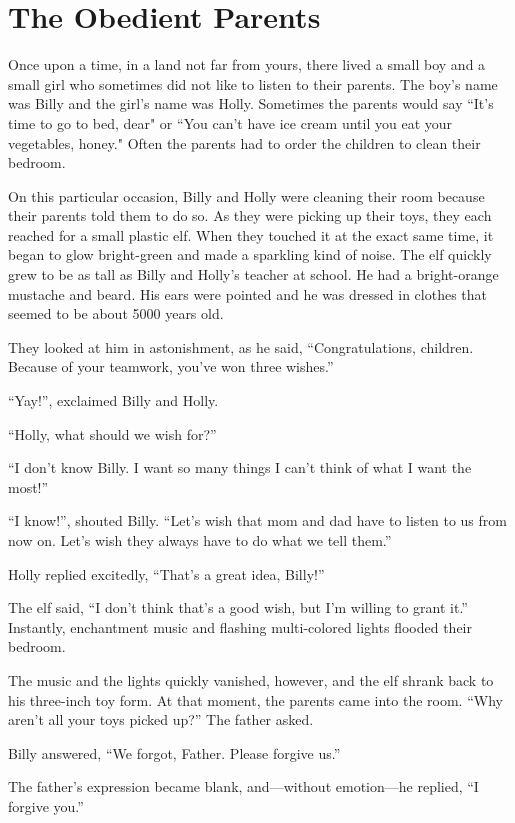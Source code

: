 \chapter{The Obedient Parents}

Once upon a time, in a land not far from yours, there lived a small boy and a small girl who sometimes did not like to listen to their parents. The boy's name was Billy and the girl's name was Holly. Sometimes the parents would say “It's time to go to bed, dear" or “You can't have ice cream until you eat your vegetables, honey." Often the parents had to order the children to clean their bedroom.

On this particular occasion, Billy and Holly were cleaning their room because their parents told them to do so. As they were picking up their toys, they each reached for a small plastic elf. When they touched it at the exact same time, it began to glow bright-green and made a sparkling kind of noise. The elf quickly grew to be as tall as Billy and Holly's teacher at school. He had a bright-orange mustache and beard. His ears were pointed and he was dressed in clothes that seemed to be about 5000 years old.

They looked at him in astonishment, as he said, “Congratulations, children. Because of your teamwork, you've won three wishes.”

“Yay!”, exclaimed Billy and Holly.

“Holly, what should we wish for?”

“I don't know Billy. I want so many things I can't think of what I want the most!”

“I know!”, shouted Billy. “Let's wish that mom and dad have to listen to us from now on. Let's wish they always have to do what we tell them.”

Holly replied excitedly, “That's a great idea, Billy!”

The elf said, “I don't think that's a good wish, but I'm willing to grant it.” Instantly, enchantment music and flashing multi-colored lights flooded their bedroom.

The music and the lights quickly vanished, however, and the elf shrank back to his three-inch toy form. At that moment, the parents came into the room. “Why aren't all your toys picked up?” The father asked.

Billy answered, “We forgot, Father. Please forgive us.”

The father's expression became blank, and—without emotion—he replied, “I forgive you.”


